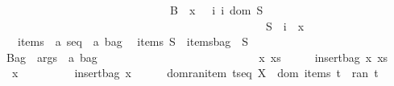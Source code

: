 \begin{isabellebody}
\ \ \ \ \ \ \ \ \ \ \ \ \ \ \ \ \ \ \ \ \ \ \ \ \ \ \ \ \ {\isacharparenleft}B\ {\isacharbrackleft}{\isacharhash}{\isacharbrackright}\ x\ {\isacharequal}\ {\isacharhash}\ {\isacharbraceleft}i{\isachardot}\ {\isacharparenleft}i{\isacharcolon}\ dom\ S{\isacharparenright}\ {\isacharampersand}\ \isanewline
\ \ \ \ \ \ \ \ \ \ \ \ \ \ \ \ \ \ \ \ \ \ \ \ \ \ \ \ \ \ \ \ \ \ \ \ \ \ \ \ \ \ \ \ \ \ {\isacharparenleft}{\isacharparenleft}S\ {\isacharpercent}{\isacharcircum}\ i{\isacharparenright}\ {\isacharequal}\ x{\isacharparenright}{\isacharbraceright}{\isacharparenright}{\isacharbraceright}{\isachardoublequoteclose}\isanewline
\isanewline
\ \ items\ {\isacharcolon}{\isacharcolon}\ {\isachardoublequoteopen}{\isacharparenleft}{\isacharprime}a\ seq{\isacharparenright}\ {\isacharequal}{\isachargreater}\ {\isacharparenleft}{\isacharprime}a\ bag{\isacharparenright}{\isachardoublequoteclose}\isanewline
\ \ {\isachardoublequoteopen}items\ S\ {\isacharequal}{\isacharequal}\ {\isacharparenleft}itemsbag\ {\isacharpercent}{\isacharcircum}\ S{\isacharparenright}{\isachardoublequoteclose}\isanewline
\ \ \isanewline
{}\isamarkupfalse%
\isanewline
{\isachardoublequoteopen}{\isacharat}Bag{\isachardoublequoteclose}\ {\isacharcolon}{\isacharcolon}\ {\isachardoublequoteopen}args\ {\isacharequal}{\isachargreater}\ {\isacharprime}a\ bag{\isachardoublequoteclose}\ \ \ \ \ \ \ \ \ \ \ \ \ \ \ \ \ \ \ \ \ \ \ \ \ {\isacharparenleft}{\isachardoublequoteopen}{\isacharpercent}{\isacharbrackleft}\ {\isacharparenleft}{\isacharunderscore}{\isacharparenright}\ {\isacharpercent}{\isacharbrackright}{\isachardoublequoteclose}{\isacharparenright}\isanewline
\isanewline
{}\isamarkupfalse%
\isanewline
{\isachardoublequoteopen}{\isacharpercent}{\isacharbrackleft}\ x{\isacharcomma}\ xs\ {\isacharpercent}{\isacharbrackright}{\isachardoublequoteclose}\ \ \ \ {\isacharequal}{\isacharequal}\ {\isachardoublequoteopen}insertbag\ x\ {\isacharpercent}{\isacharbrackleft}xs{\isacharpercent}{\isacharbrackright}{\isachardoublequoteclose}\isanewline
{\isachardoublequoteopen}{\isacharpercent}{\isacharbrackleft}\ x\ {\isacharpercent}{\isacharbrackright}{\isachardoublequoteclose}\ \ \ \ \ \ \ \ {\isacharequal}{\isacharequal}\ {\isachardoublequoteopen}insertbag\ x\ {\isacharpercent}{\isacharbrackleft}{\isacharpercent}{\isacharbrackright}{\isachardoublequoteclose}\isanewline
\isanewline
\isanewline
\isanewline
\isanewline
{}\isamarkupfalse%
\ \ \isanewline
\ \ dom{\isacharunderscore}ran{\isacharunderscore}item{\isacharcolon}\ {\isachardoublequoteopen}t{\isacharcolon}seq\ X\ {\isacharminus}{\isacharminus}{\isachargreater}\ {\isacharparenleft}{\isacharparenleft}dom\ {\isacharparenleft}items\ t{\isacharparenright}{\isacharparenright}\ {\isacharequal}\ {\isacharparenleft}ran\ t{\isacharparenright}{\isacharparenright}{\isachardoublequoteclose}\isanewline

\end{isabellebody}
